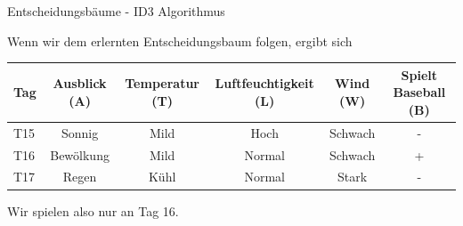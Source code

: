 \begin{task}[credit=16]{Entscheidungsbäume - ID3 Algorithmus}
\begin{subtask}[points=3,title=Vorhersage]
\begin{solution}
Wenn wir dem erlernten Entscheidungsbaum folgen, ergibt sich
\begin{table}[h!]
	\centering
	\begin{tabular}{l|c|c|c|c|c}
		\toprule
		\textbf{Tag} & \textbf{Ausblick (A)} & \textbf{Temperatur (T)}  & \textbf{Luftfeuchtigkeit (L)} & \textbf{Wind (W)}     & \textbf{Spielt Baseball (B)} \\
		\midrule
		T15 & Sonnig    & Mild        & Hoch     & Schwach & -       \\
		T16 & Bewölkung & Mild        & Normal   & Schwach & +       \\
		T17 & Regen     & Kühl        & Normal   & Stark   & -       \\
		\bottomrule
	\end{tabular}
\end{table}
\newline
Wir spielen also nur an Tag 16.
\end{solution}

\end{subtask}
\end{task}